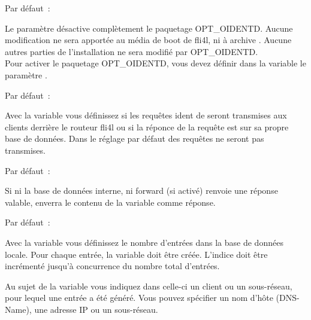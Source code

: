\begin{description}


  Par défaut~: 

  Le paramètre  désactive complètement le paquetage OPT\_OIDENTD.
  Aucune modification ne sera apportée au média de boot de fli4l, ni à
  archive . Aucune autres parties de l'installation ne sera modifié
  par OPT\_OIDENTD.\\ 
  Pour activer le paquetage OPT\_OIDENTD, vous devez définir dans la variable
   le paramètre . 



  Par défaut~: 

  Avec la variable  vous définissez si les requêtes ident de
   seront transmises aux clients derrière le routeur fli4l ou si la
  réponce de la requête est sur sa propre base de données. Dans le réglage par défaut
  des requêtes ne seront pas transmises.


  Par défaut~: 

  Si ni la base de données interne, ni forward (si activé) renvoie une réponse
  valable,  enverra le contenu de la variable 
  comme réponse.


  Par défaut~: 

  Avec la variable  vous définissez le nombre d'entrées
  dans la base de données locale. Pour chaque entrée, la variable
   doit être créée. L'indice  doit être incrémenté
  jusqu'à concurrence du nombre total d'entrées.


  Au sujet de la variable  vous indiquez dans celle-ci
  un client ou un sous-réseau, pour lequel une entrée a été généré. Vous pouvez
  spécifier un nom d'hôte (DNS-Name), une adresse IP ou un sous-réseau.


\end{description}
